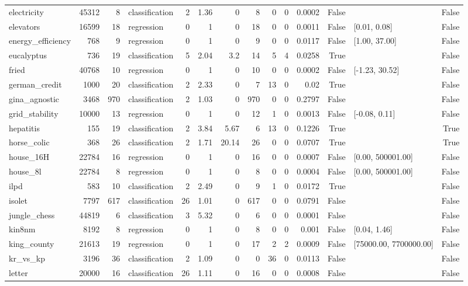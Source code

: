 \begin{table}
\begin{tabular}{lrrlrrrrrrrrlr}
electricity & 45312 & 8 & classification & 2 & 1.36 & 0 & 8 & 0 & 0 & 0.0002 & False &  & False \\
elevators & 16599 & 18 & regression & 0 & 1 & 0 & 18 & 0 & 0 & 0.0011 & False & [0.01, 0.08] & False \\
energy\_efficiency & 768 & 9 & regression & 0 & 1 & 0 & 9 & 0 & 0 & 0.0117 & False & [1.00, 37.00] & False \\
eucalyptus & 736 & 19 & classification & 5 & 2.04 & 3.2 & 14 & 5 & 4 & 0.0258 & True &  & False \\
fried & 40768 & 10 & regression & 0 & 1 & 0 & 10 & 0 & 0 & 0.0002 & False & [-1.23, 30.52] & False \\
german\_credit & 1000 & 20 & classification & 2 & 2.33 & 0 & 7 & 13 & 0 & 0.02 & True &  & False \\
gina\_agnostic & 3468 & 970 & classification & 2 & 1.03 & 0 & 970 & 0 & 0 & 0.2797 & False &  & False \\
grid\_stability & 10000 & 13 & regression & 0 & 1 & 0 & 12 & 1 & 0 & 0.0013 & False & [-0.08, 0.11] & False \\
hepatitis & 155 & 19 & classification & 2 & 3.84 & 5.67 & 6 & 13 & 0 & 0.1226 & True &  & True \\
horse\_colic & 368 & 26 & classification & 2 & 1.71 & 20.14 & 26 & 0 & 0 & 0.0707 & True &  & True \\
house\_16H & 22784 & 16 & regression & 0 & 1 & 0 & 16 & 0 & 0 & 0.0007 & False & [0.00, 500001.00] & False \\
house\_8l & 22784 & 8 & regression & 0 & 1 & 0 & 8 & 0 & 0 & 0.0004 & False & [0.00, 500001.00] & False \\
ilpd & 583 & 10 & classification & 2 & 2.49 & 0 & 9 & 1 & 0 & 0.0172 & True &  & False \\
isolet & 7797 & 617 & classification & 26 & 1.01 & 0 & 617 & 0 & 0 & 0.0791 & False &  & False \\
jungle\_chess & 44819 & 6 & classification & 3 & 5.32 & 0 & 6 & 0 & 0 & 0.0001 & False &  & False \\
kin8nm & 8192 & 8 & regression & 0 & 1 & 0 & 8 & 0 & 0 & 0.001 & False & [0.04, 1.46] & False \\
king\_county & 21613 & 19 & regression & 0 & 1 & 0 & 17 & 2 & 2 & 0.0009 & False & [75000.00, 7700000.00] & False \\
kr\_vs\_kp & 3196 & 36 & classification & 2 & 1.09 & 0 & 0 & 36 & 0 & 0.0113 & False &  & False \\
letter & 20000 & 16 & classification & 26 & 1.11 & 0 & 16 & 0 & 0 & 0.0008 & False &  & False \\

\end{tabular}
\end{table}
